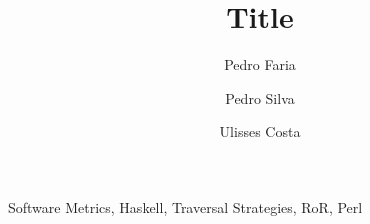 \documentclass[citeauthoryear]{llncs}
\title{Title}
\author{Pedro Faria \and Pedro Silva \and Ulisses Costa}
\institute{Department of Informatics, University of Minho}
\begin{document}
\maketitle



\keywords Software Metrics, Haskell, Traversal Strategies, RoR, Perl








\end{document}
